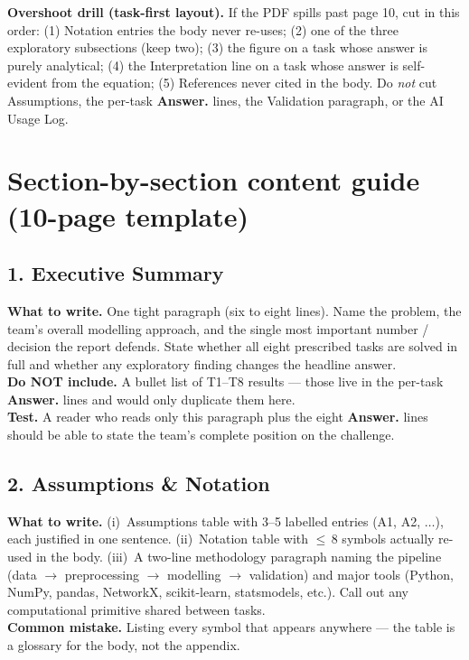 \documentclass[11pt,a4paper]{article}
\begin{document}
\begin{warnbox}
\textbf{Overshoot drill (task-first layout).} If the PDF spills past page 10, cut in this order: (1) Notation entries the body never re-uses; (2) one of the three exploratory subsections (keep two); (3) the figure on a task whose answer is purely analytical; (4) the Interpretation line on a task whose answer is self-evident from the equation; (5) References never cited in the body. Do \emph{not} cut Assumptions, the per-task \textbf{Answer.} lines, the Validation paragraph, or the AI Usage Log.
\end{warnbox}

\section{Section-by-section content guide (10-page template)}

\subsection*{1. Executive Summary}
\textbf{What to write.} One tight paragraph (six to eight lines). Name the problem, the team's overall modelling approach, and the single most important number / decision the report defends. State whether all eight prescribed tasks are solved in full and whether any exploratory finding changes the headline answer.\\
\textbf{Do NOT include.} A bullet list of T1--T8 results — those live in the per-task \textbf{Answer.} lines and would only duplicate them here.\\
\textbf{Test.} A reader who reads only this paragraph plus the eight \textbf{Answer.} lines should be able to state the team's complete position on the challenge.

\subsection*{2. Assumptions \& Notation}
\textbf{What to write.} (i)~Assumptions table with 3--5 labelled entries (A1, A2, $\ldots$), each justified in one sentence. (ii)~Notation table with $\leq$\,8 symbols actually re-used in the body. (iii)~A two-line methodology paragraph naming the pipeline (data $\to$ preprocessing $\to$ modelling $\to$ validation) and major tools (Python, NumPy, pandas, NetworkX, scikit-learn, statsmodels, etc.). Call out any computational primitive shared between tasks.\\
\textbf{Common mistake.} Listing every symbol that appears anywhere — the table is a glossary for the body, not the appendix.
\end{document}
